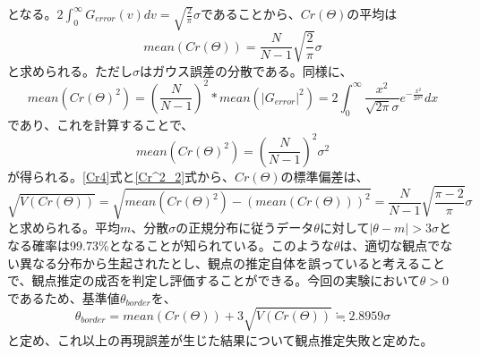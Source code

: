 となる。$2\int_{0}^{\infty}G_{error}(v)dv = \sqrt{\frac{2}{\pi}}σ$であることから、$Cr(Θ)$の平均は
	\begin{equation}
		\label{Cr4}
		mean(Cr(Θ)) = \frac{N}{N-1}\sqrt{\frac{2}{\pi}}σ
	\end{equation}
と求められる。ただし$σ$はガウス誤差の分散である。同様に、
	\begin{equation}
		\label{Cr^2_1}
		mean(Cr(Θ)^2) = \left(\frac{N}{N-1}\right)^2 * mean(|G_{error}|^2) 
		= 2\int_{0}^{\infty}\frac{x^2}{\sqrt{2\pi}σ}e^{-\frac{x^2}{2σ^2}}dx
	\end{equation}
であり、これを計算することで、
	\begin{equation}
		\label{Cr^2_2}
		mean(Cr(Θ)^2) = \left(\frac{N}{N-1}\right)^2 σ^2
	\end{equation}
が得られる。\ref{Cr4}式と\ref{Cr^2_2}式から、$Cr(Θ)$の標準偏差は、
	\begin{equation}
		\sqrt{V(Cr(Θ))} = \sqrt{mean(Cr(Θ)^2) - \left(mean(Cr(Θ))\right)^2} = \frac{N}{N-1}\sqrt{\frac{\pi-2}{\pi}}σ
	\end{equation}
と求められる。平均$m$、分散$σ$の正規分布に従うデータ$θ$に対して$|θ-m|>3σ$となる確率は99.73\%となることが知られている。このような$θ$は、適切な観点でない異なる分布から生起されたとし、観点の推定自体を誤っていると考えることで、観点推定の成否を判定し評価することができる。今回の実験において$θ>0$であるため、基準値$θ_{border}$を、
	\begin{equation}
		θ_{border} = mean(Cr(Θ))+3\sqrt{V(Cr(Θ))}≒2.8959σ
	\end{equation}
と定め、これ以上の再現誤差が生じた結果について観点推定失敗と定めた。

